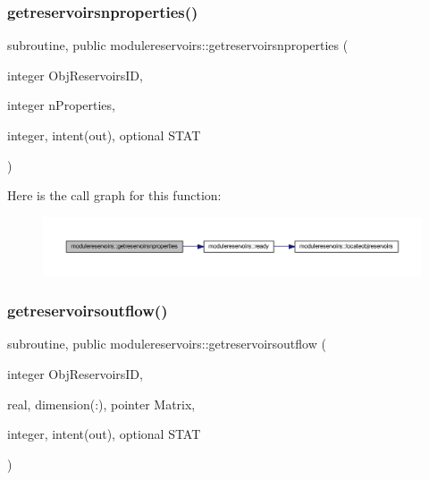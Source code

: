 \subsubsection{\texorpdfstring{getreservoirsnproperties()}{getreservoirsnproperties()}}
{\footnotesize\ttfamily subroutine, public modulereservoirs\+::getreservoirsnproperties (\begin{DoxyParamCaption}\item[{integer}]{Obj\+Reservoirs\+ID,  }\item[{integer}]{n\+Properties,  }\item[{integer, intent(out), optional}]{S\+T\+AT }\end{DoxyParamCaption})}

Here is the call graph for this function\+:\nopagebreak
\begin{figure}[H]
\begin{center}
\leavevmode
\includegraphics[width=350pt]{namespacemodulereservoirs_a53b63e6050bd055646e8d248c77b9d39_cgraph}
\end{center}
\end{figure}
\mbox{\label{namespacemodulereservoirs_a92177000a842b34a96a2edc6b49e3128}} 
\subsubsection{\texorpdfstring{getreservoirsoutflow()}{getreservoirsoutflow()}}
{\footnotesize\ttfamily subroutine, public modulereservoirs\+::getreservoirsoutflow (\begin{DoxyParamCaption}\item[{integer}]{Obj\+Reservoirs\+ID,  }\item[{real, dimension(\+:), pointer}]{Matrix,  }\item[{integer, intent(out), optional}]{S\+T\+AT }\end{DoxyParamCaption})}

